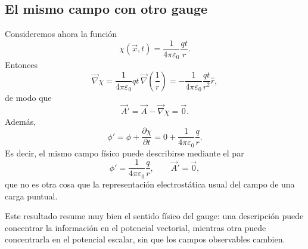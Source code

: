 \documentclass[12pt,a4paper]{article}
\theoremstyle{definition}
\theoremstyle{plain}
\numberwithin{equation}{section}
\theoremstyle{remark}
\begin{document}
\subsection*{El mismo campo con otro gauge}
Consideremos ahora la función
\begin{equation*}
    \chi(\vec x,t)=\frac{1}{4\pi\varepsilon_0}\frac{qt}{r}.
\end{equation*}
Entonces
\begin{equation*}
    \vec\nabla \chi = \frac{1}{4\pi\varepsilon_0}qt\,\vec\nabla\left(\frac{1}{r}\right)
    = -\frac{1}{4\pi\varepsilon_0}\frac{qt}{r^2}\hat r,
\end{equation*}
de modo que
\begin{equation*}
    \vec A' = \vec A - \vec\nabla\chi = \vec 0.
\end{equation*}
Además,
\begin{equation*}
    \phi' = \phi + \frac{\partial \chi}{\partial t}
    = 0 + \frac{1}{4\pi\varepsilon_0}\frac{q}{r}.
\end{equation*}
Es decir, el mismo campo físico puede describirse mediante el par
\begin{equation*}
    \phi' = \frac{1}{4\pi\varepsilon_0}\frac{q}{r},
    \qquad
    \vec A' = \vec 0,
\end{equation*}
que no es otra cosa que la representación electrostática usual del campo de una carga puntual.

Este resultado resume muy bien el sentido físico del gauge: una descripción puede concentrar la información en el potencial vectorial, mientras otra puede concentrarla en el potencial escalar, sin que los campos observables cambien.
\end{document}
